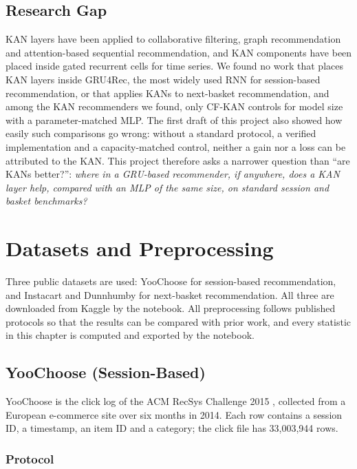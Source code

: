 \documentclass[12pt,a4paper]{report}
\begin{document}
\section{Research Gap}

KAN layers have been applied to collaborative filtering, graph recommendation and
attention-based sequential recommendation, and KAN components have been placed
inside gated recurrent cells for time series. We found no work that places KAN
layers inside GRU4Rec, the most widely used RNN for session-based recommendation,
or that applies KANs to next-basket recommendation, and among the KAN
recommenders we found, only CF-KAN controls for model size with a
parameter-matched MLP. The first draft of this
project also showed how easily such comparisons go wrong: without a standard
protocol, a verified implementation and a capacity-matched control, neither a
gain nor a loss can be attributed to the KAN. This project therefore asks a
narrower question than ``are KANs better?'': \emph{where in a GRU-based
recommender, if anywhere, does a KAN layer help, compared with an MLP of the same
size, on standard session and basket benchmarks?}

\chapter{Datasets and Preprocessing}
\label{ch:data}

Three public datasets are used: YooChoose for session-based recommendation, and
Instacart and Dunnhumby for next-basket recommendation. All three are downloaded
from Kaggle by the notebook. All preprocessing follows published protocols so
that the results can be compared with prior work, and every statistic in this
chapter is computed and exported by the notebook.

\section{YooChoose (Session-Based)}

YooChoose is the click log of the ACM RecSys Challenge 2015 \cite{benshimon2015},
collected from a European e-commerce site over six months in 2014. Each row
contains a session ID, a timestamp, an item ID and a category; the click file has
33,003,944 rows.

\subsection{Protocol}
\end{document}
